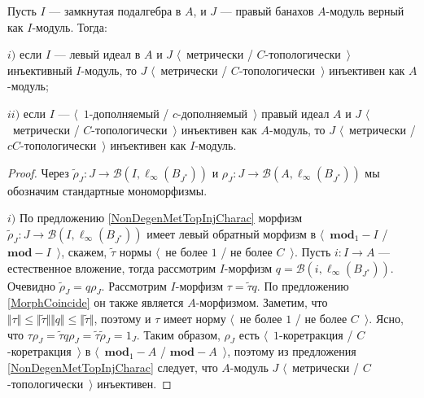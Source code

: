 \begin{proposition}\label{MetTopInjUnderChangeOfAlg} Пусть $I$ --- замкнутая подалгебра в $A$, и $J$ --- правый банахов $A$-модуль верный как $I$-модуль. Тогда:

$i)$ если $I$ --- левый идеал в $A$ и $J$ $\langle$~метрически / $C$-топологически~$\rangle$ инъективный $I$-модуль, то $J$ $\langle$~метрически / $C$-топологически~$\rangle$ инъективен как $A$-модуль;

$ii)$ если $I$ --- $\langle$~$1$-дополняемый / $c$-дополняемый~$\rangle$ правый идеал $A$ и $J$ $\langle$~метрически / $C$-топологически~$\rangle$ инъективен как $A$-модуль, то $J$ $\langle$~метрически / $cC$-топологически~$\rangle$ инъективен как $I$-модуль.
\end{proposition}
\begin{proof} Через $\widetilde{\rho}_J:J\to\mathcal{B}(I,\ell_\infty(B_{J^*}))$ и $\rho_J:J\to\mathcal{B}(A,\ell_\infty(B_{J^*}))$ мы обозначим стандартные мономорфизмы.

$i)$ По предложению \ref{NonDegenMetTopInjCharac} морфизм $\widetilde{\rho}_J: J\to\mathcal{B}(I,\ell_\infty(B_{J^*}))$ имеет левый обратный морфизм в $\langle$~$\mathbf{mod}_1-I$ / $\mathbf{mod}-I$~$\rangle$, скажем, $\widetilde{\tau}$ нормы $\langle$~не более $1$ / не более $C$~$\rangle$. Пусть $i:I\to A$ --- естественное вложение, тогда рассмотрим $I$-морфизм $q=\mathcal{B}(i,\ell_\infty(B_{J^*}))$. Очевидно $\widetilde{\rho}_J=q\rho_J$. Рассмотрим $I$-морфизм $\tau =\widetilde{\tau} q$. По предложению \ref{MorphCoincide} он также является $A$-морфизмом. Заметим, что $\Vert\tau \Vert\leq\Vert\widetilde{\tau}\Vert\Vert q\Vert\leq\Vert\widetilde{\tau}\Vert$, поэтому и $\tau$ имеет норму $\langle$~не более $1$ / не более $C$~$\rangle$. Ясно, что $\tau \rho_J=\widetilde{\tau} q\rho_J=\widetilde{\tau}\widetilde{\rho}_J=1_J$. Таким образом, $\rho_J$ есть $\langle$~$1$-коретракция / $C$-коретракция~$\rangle$ в $\langle$~$\mathbf{mod}_1-A$ / $\mathbf{mod}-A$~$\rangle$, поэтому из предложения \ref{NonDegenMetTopInjCharac} следует, что $A$-модуль $J$ $\langle$~метрически / $C$-топологически~$\rangle$ инъективен.


\end{proof}
